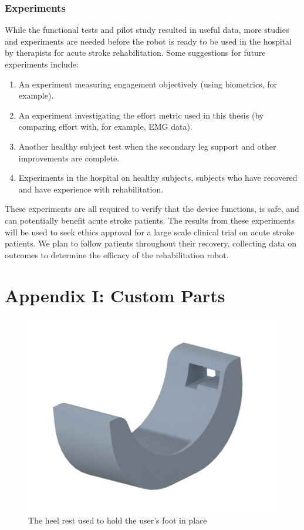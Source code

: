 \documentclass[12pt]{report}
\begin{document}
	\subsection{Experiments}
	
	While the functional tests and pilot study resulted in useful data, more studies and experiments are needed before the robot is ready to be used in the hospital by therapists for acute stroke rehabilitation. Some suggestions for future experiments include: 
	
	\begin{enumerate}
		\item An experiment measuring engagement objectively (using biometrics, for example).
		\item An experiment investigating the effort metric used in this thesis (by comparing effort with, for example, EMG data).
		\item Another healthy subject test when the secondary leg support and other improvements are complete.
		\item Experiments in the hospital on healthy subjects, subjects who have recovered and have experience with rehabilitation.
	\end{enumerate}
	
	These experiments are all required to verify that the device functions, is safe, and can potentially benefit acute stroke patients. The results from these experiments will be used to seek ethics approval for a large scale clinical trial on acute stroke patients. We plan to follow patients throughout their recovery, collecting data on outcomes to determine the efficacy of the rehabilitation robot. 
	

	

\chapter*{Appendix I: Custom Parts} \label{ap:parts}

	\begin{figure}[h] 
		\centering
		\includegraphics[width=0.9\linewidth]{heelrest01}
		\caption{The heel rest used to hold the user's foot in place}
		\label{fig:heelrest}
	\end{figure}
	
\end{document}
